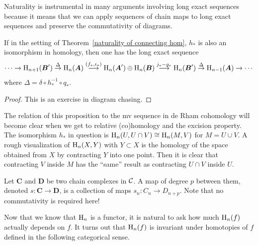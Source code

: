 Naturality is instrumental in many arguments involving long exact sequences because it means that we can apply sequences of chain maps to long exact sequences and preserve the commutativity of diagrams.

\begin{prop}\label{prop algebraic MV}
    If in the setting of Theorem~\ref{naturality of connecting hom}, $h_\ast$ is also an isomorphism in homology, then one has the long exact sequence
    \[\cdots \to \mathrm{H}_{n+1}(\boldsymbol{B}')\overset\Delta\to \mathrm{H}_n(\boldsymbol{A})\overset{(f_\ast,i_\ast)}\longrightarrow \mathrm{H}_n(\boldsymbol{A}')\oplus \mathrm{H}_n(\boldsymbol{B})\overset{j_\ast- g_\ast}\longrightarrow \mathrm{H}_n(\boldsymbol{B}')\overset{\Delta}\to \mathrm{H}_{n-1}(\boldsymbol{A})\to \cdots\]
    where $\Delta=\delta \circ h_\ast^{-1}\circ q_\ast$.
\end{prop}
\begin{proof}
     This is an exercise in diagram chasing.
\end{proof}

The relation of this proposition to the \gls{mv} sequence in de Rham cohomology will become clear when we get to relative (co)homology and the excision property. The isomorphism $h_\ast$ in question is $\mathrm{H}_n(U,U\cap V)\cong \mathrm{H}_n(M,V)$ for $M=U\cup V$. A rough visualization of $\mathrm{H}_n(X,Y)$ with $Y\subset X$ is the homology of the space obtained from $X$ by contracting $Y$ into one point. Then it is clear that contracting $V$ inside $M$ has the ``same'' result as contracting $U\cap V$ inside $U$. 


\begin{defn}
    Let $\bm{C}$ and $\bm{D}$ be two chain complexes in $\mathcal{C}$. A map of degree $p$ between them, denoted $s:\bm{C}\to \bm{D}$, is a collection of maps $s_n:C_n\to D_{n+p}$. Note that no commutativity is required here!
\end{defn}


Now that we know that $\mathrm{H}_n$ is a functor, it is natural to ask how much $\mathrm{H}_n(f)$ actually depends on $f$. It turns out that $\mathrm{H}_n(f)$ is invariant under homotopies of $f$ defined in the following categorical sense.


